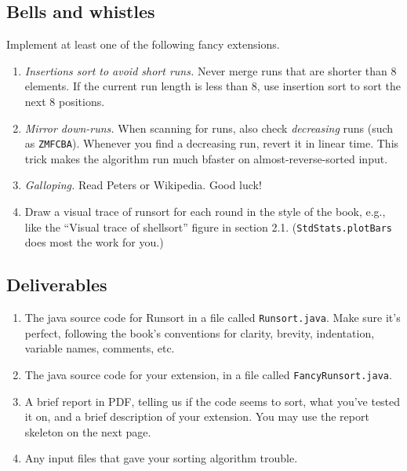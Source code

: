 \documentclass{tufte-handout}
\begin{document}
\subsection{Bells and whistles}
Implement at least one of the following fancy extensions.
\begin{enumerate}
\item \emph{Insertions sort to avoid short runs.}
  Never merge runs that are shorter than 8 elements.
  If the current run length is less than 8,
  use insertion sort to sort the next 8 positions.
\item \emph{Mirror down-runs.}
  When scanning for runs, also check \emph{decreasing} runs (such as \texttt{ZMFCBA}).
  Whenever you find a decreasing run, revert it in linear time.
  This trick makes the algorithm run much bfaster on almost-reverse-sorted input.
\item \emph{Galloping.} Read Peters or Wikipedia. Good luck!
\item Draw a visual trace of runsort for each round in the style of the book, e.g., like the ``Visual trace of shellsort'' figure in section 2.1.
  (\texttt{StdStats.plotBars} does most the work for you.)
\end{enumerate}

\subsection{Deliverables}

\begin{enumerate}
  \item The java source code for Runsort in a file called {\tt Runsort.java}.
      Make sure it's perfect, following the book's conventions for clarity, brevity, indentation, variable names, comments, etc.
  \item The java source code for your extension, in a file called {\tt FancyRunsort.java}.
  \item A brief report in PDF, telling us if the code seems to sort, what you've tested it on, and a brief description of your extension.
  You may use the report skeleton on the next page.
  \item Any input files that gave your sorting algorithm trouble.
\end{enumerate}
\end{document}

